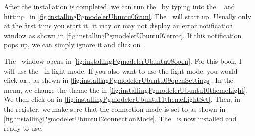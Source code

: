 After the installation is completed, we can run the \pgmodeler\ by typing  into the \bash\  and hitting~\keys{\return} in \cref{fig:installingPgmodelerUbuntu06run}.
The \pgmodeler\ will start up.
Usually only at the first time you start it, it may or may not display an error notification window as shown in \cref{fig:installingPgmodelerUbuntu07error}.
If this notification pops up, we can simply ignore it and click on~.

The \pgmodeler\ window opens in \cref{fig:installingPgmodelerUbuntu08open}.
For this book, I will use the \pgmodeler\ in light mode.
If you also want to use the light mode, you would click on , as shown in \cref{fig:installingPgmodelerUbuntu09openSettings}.
In the  menu, we change the theme the  in \cref{fig:installingPgmodelerUbuntu10themeLight}.
We then click on  in \cref{fig:installingPgmodelerUbuntu11themeLightSet}.
Then, in the  register, we make sure that the connection mode is set to  as shown in \cref{fig:installingPgmodelerUbuntu12connectionMode}.
The \pgmodeler\ is now installed and ready to use.%
\FloatBarrier%
\endhsection%
%

